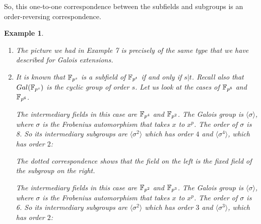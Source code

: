 \documentclass[12pt]{article}
\theoremstyle{plain}
\newtheorem{example}{Example}
\theoremstyle{definition}
\theoremstyle{remark}
\begin{document}
\medskip
\noindent
So, this one-to-one correspondence between the subfields and subgroups is an order-reversing correspondence. 

\begin{example}
\begin{enumerate}
    \item The picture we had in Example 7 is precisely of the same type that we have described for Galois extensions.
\item It is known that $\mathbb{F}_{p^s}$ is a subfield of $\mathbb{F}_{p^t}$ if and only if $s|t$. Recall also that $Gal(\mathbb{F}_{p^s})$ is the cyclic group of order $s$. Let us look at the cases of $\mathbb{F}_{p^8}$ and $\mathbb{F}_{p^6}$. 

\medskip 
{} The intermediary fields in this case are $\mathbb{F}_{p^4}$ and $\mathbb{F}_{p^2}$. The Galois group is $\langle\sigma\rangle$, where $\sigma$ is the Frobenius automorphism that takes $x$ to $x^p$. The order of $\sigma$ is 8. So its intermediary subgroups are $\langle \sigma^2\rangle$ which has order $4$ and $\langle \sigma^4\rangle$, which has order $2$:

 
The dotted correspondence shows that the field on the left is the fixed field of the subgroup on the right. 

\medskip 
{} The intermediary fields in this case are $\mathbb{F}_{p^2}$ and $\mathbb{F}_{p^3}$. The Galois group is $\langle\sigma\rangle$, where $\sigma$ is the Frobenius automorphism that takes $x$ to $x^p$. The order of $\sigma$ is 6. So its intermediary subgroups are $\langle \sigma^2\rangle$ which has order $3$ and $\langle \sigma^3\rangle$, which has order $2$:


\end{enumerate}
\end{example}
\end{document}
